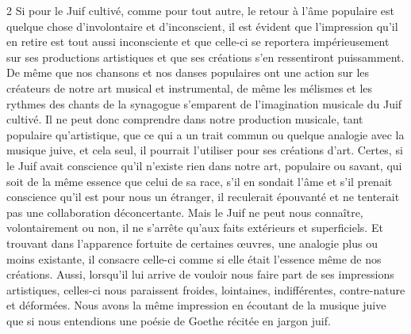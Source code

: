 \documentclass[a4paper,12pt]{article}
\begin{document}
\begin{paracol}{2}
         {Si pour le Juif cultivé, comme pour tout autre, le retour à l’âme populaire est quelque chose d’involontaire et d’inconscient, il est évident que l’impression qu’il en retire est tout aussi inconsciente et que celle-ci se reportera impérieusement sur ses productions artistiques et que ses créations s’en ressentiront puissamment. De même que nos chansons et nos danses populaires ont une action sur les créateurs de notre art musical et instrumental, de même les mélismes et les rythmes des chants de la synagogue s’emparent de l’imagination musicale du Juif cultivé. Il ne peut donc comprendre dans notre production musicale, tant populaire qu’artistique, que ce qui a un trait commun ou quelque analogie avec la musique juive, et cela seul, il pourrait l’utiliser pour ses créations d’art. Certes, si le Juif avait conscience qu’il n’existe rien dans notre art, populaire ou savant, qui soit de la même essence que celui de sa race, s’il en sondait l’âme et s’il prenait conscience qu’il est pour nous un étranger, il reculerait épouvanté et ne tenterait pas une collaboration déconcertante. Mais le Juif ne peut nous connaître, volontairement ou non, il ne s’arrête qu’aux faits extérieurs et superficiels. Et trouvant dans l’apparence fortuite de certaines œuvres, une analogie plus ou moins existante, il consacre celle-ci comme si elle était l’essence même de nos créations. Aussi, lorsqu’il lui arrive de vouloir nous faire part de ses impressions artistiques, celles-ci nous paraissent froides, lointaines, indifférentes, contre-nature et déformées. Nous avons la même impression en écoutant de la musique juive que si nous entendions une poésie de Goethe récitée en jargon juif.}

\end{paracol}
\end{document}
